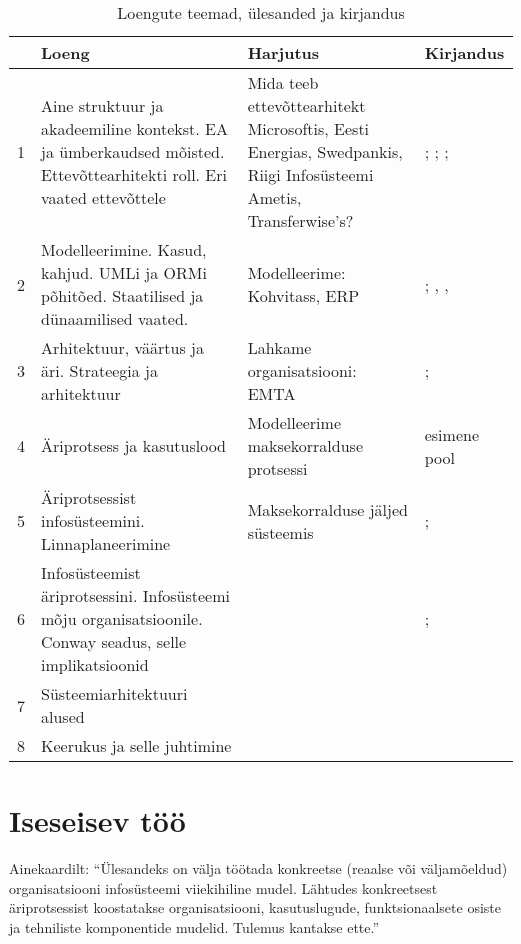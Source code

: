 \documentclass[nobib]{tufte-handout}
\begin{document}
\renewcommand{\arraystretch}{1.3}
\begin{table*}[ht]
\small
	\centering
	\selectfont
	\begin{tabular}{lp{5cm}p{6cm}p{4cm}}
		\toprule
		& Loeng & Harjutus & Kirjandus\\
		\midrule
		1 & Aine struktuur ja akadeemiline kontekst. EA ja ümberkaudsed mõisted. Ettevõttearhitekti roll. Eri vaated ettevõttele & Mida teeb ettevõttearhitekt Microsoftis, Eesti Energias, Swedpankis, Riigi Infosüsteemi Ametis, Transferwise's?  & \cite{parsons2005enterprise}; \cite{hickey}; \cite{sysengineering}; \cite{winter2006essential}\\
		2 & Modelleerimine. Kasud, kahjud. UMLi ja ORMi põhitõed. Staatilised ja dünaamilised vaated. & Modelleerime: Kohvitass, ERP & \cite{OPM}; \cite{heumann2005introduction}, \cite{box1976science}, \cite[peatükk 3]{ferenvcik2004survey}\\
		3 & Arhitektuur, väärtus ja äri. Strateegia ja arhitektuur & Lahkame organisatsiooni: EMTA & \cite{gadiesh2001transforming}; \cite{senge2002leader}\\
		4 & Äriprotsess ja kasutuslood & Modelleerime maksekorralduse protsessi & \cite{checkland2000soft} esimene pool \\
		5 & Äriprotsessist infosüsteemini. Linnaplaneerimine & Maksekorralduse jäljed süsteemis & \cite{wohed2006suitability}; \cite{bertin2014urbanization}\\
		6 & Infosüsteemist äriprotsessini. Infosüsteemi mõju organisatsioonile. Conway seadus, selle implikatsioonid & & \cite{conway1968committees}; \cite{maccormack2012exploring}\\
		7 & Süsteemiarhitektuuri alused & & \cite{crawley2015system}\\
		8 & Keerukus ja selle juhtimine & & \cite{holt2017so}\\
		\bottomrule
	\end{tabular}
	\caption{Loengute teemad, ülesanded ja kirjandus}
	\label{tab:content}
\end{table*}

\section{Iseseisev töö}
Ainekaardilt: \enquote{Ülesandeks on välja töötada konkreetse (reaalse või väljamõeldud) organisatsiooni infosüsteemi viiekihiline mudel. Lähtudes konkreetsest äriprotsessist koostatakse organisatsiooni, kasutuslugude, funktsionaalsete osiste ja tehniliste komponentide mudelid. Tulemus kantakse ette.}
\end{document}
